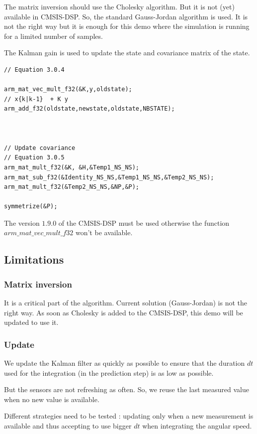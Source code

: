 \documentclass[titlepage,a4,12pt]{article}
\numberwithin{equation}{subsection}
\begin{document}
The matrix inversion should use the Cholesky algorithm. But it is not (yet) available in CMSIS-DSP.
So, the standard Gauss-Jordan algorithm is used. It is not the right way but it is enough for this demo where the simulation is running for a limited number of samples.


The Kalman gain is used to update the state and covariance matrix of the state.

\begin{verbatim}
// Equation 3.0.4

arm_mat_vec_mult_f32(&K,y,oldstate);
// x{k|k-1}  + K y
arm_add_f32(oldstate,newstate,oldstate,NBSTATE);



// Update covariance
// Equation 3.0.5
arm_mat_mult_f32(&K, &H,&Temp1_NS_NS);
arm_mat_sub_f32(&Identity_NS_NS,&Temp1_NS_NS,&Temp2_NS_NS);
arm_mat_mult_f32(&Temp2_NS_NS,&NP,&P);

symmetrize(&P);
\end{verbatim}

The version $1.9.0$ of the CMSIS-DSP must be used otherwise the function $arm\_mat\_vec\_mult\_f32$ won't be available.


\subsection{Limitations}

\subsubsection{Matrix inversion}

It is a critical part of the algorithm. Current solution (Gauss-Jordan) is not the right way.
As soon as Cholesky is added to the CMSIS-DSP, this demo will be updated to use it.

\subsubsection{Update}

We update the Kalman filter as quickly as possible to ensure that the duration $dt$ used for the integration (in the prediction step) is as low as possible.

But the sensors are not refreshing as often. So, we reuse the last measured value when no new value is available.


Different strategies need to be tested : updating only when a new measurement is available and thus accepting to use bigger $dt$ when integrating the angular speed.
\end{document}
